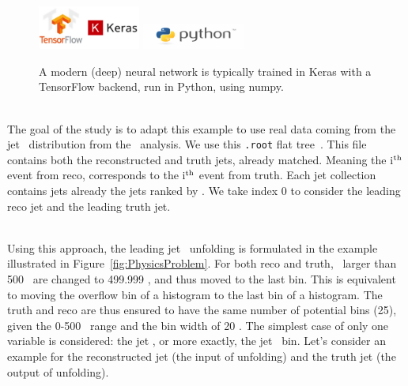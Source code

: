 \begin{figure}[h]
  \centering
  \includegraphics[width=0.30\textwidth]{../presentation/plots/TensorFlow_Keras.png}
  \includegraphics[width=0.30\textwidth]{../presentation/plots/Python.png}
  \caption{A modern (deep) neural network is typically trained in Keras with a TensorFlow backend, run in Python, using numpy.}
  \label{fig:CodeSoftware}
\end{figure}

\ \\The goal of the study is to adapt this example to use real data coming from the jet \pt~distribution from the \ttbaremu~analysis. We use this \texttt{.root} flat tree~\cite{RootFile}. This file contains both the reconstructed and truth jets, already matched. Meaning the i$^{\rm th}$ event from reco, corresponds to the i$^{\rm th}$ event from truth. Each jet collection contains jets already the jets ranked by \pt. We take index 0 to consider the leading reco jet and the leading truth jet.

\ \\Using this approach, the leading jet \pt~unfolding is formulated in the example illustrated in Figure~\ref{fig:PhysicsProblem}. For both reco and truth, \pt~larger than 500 \GeV~are changed to 499.999 \GeV, and thus moved to the last bin. This is equivalent to moving the overflow bin of a histogram to the last bin of a histogram. The truth and reco are thus ensured to have the same number of potential bins (25), given the 0-500 \GeV~range and the bin width of 20 \GeV. The simplest case of only one variable is considered: the jet \pt, or more exactly, the jet \pt~bin. Let's consider an example for the reconstructed jet (the input of unfolding) and the truth jet (the output of unfolding).

